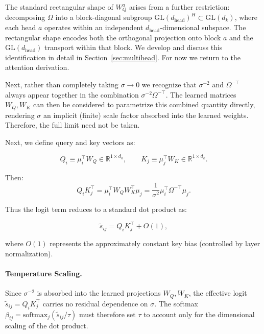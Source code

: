 \documentclass[twoside,11pt]{article}
\begin{document}
The standard rectangular shape of $W_Q^a$ arises from a further restriction: decomposing $\Omega$ into a block-diagonal subgroup $\mathrm{GL}(d_{\text{head}})^H \subset \mathrm{GL}(d_k)$, where each head $a$ operates within an independent $d_{\text{head}}$-dimensional subspace. The rectangular shape encodes both the orthogonal projection onto block $a$ and the $\mathrm{GL}(d_{\text{head}})$ transport within that block. We develop and discuss this identification in detail in Section~\ref{sec:multihead}. For now we return to the attention derivation.

Next, rather than completely taking $\sigma \to 0$ we recognize that $\sigma^{-2}$ and $\Omega^{-\top}$ always appear together in the combination $\sigma^{-2}\Omega^{-\top}$. The learned matrices $W_Q, W_K$ can then be considered to parametrize this combined quantity directly, rendering $\sigma$ an implicit (finite) scale factor absorbed into the learned weights. Therefore, the full limit need not be taken.

Next, we define query and key vectors as:

\begin{equation}
Q_i \equiv \mu_i^\top W_Q \in \mathbb{R}^{1\times d_k}, \qquad K_j \equiv \mu_j^\top W_K \in \mathbb{R}^{1\times d_k}.
\end{equation}

Then:
\begin{equation}
Q_i K_j^\top = \mu_i^\top W_Q W_K^\top \mu_j = \frac{1}{\sigma^2}\mu_i^\top \Omega^{-\top} \mu_j.
\end{equation}

Thus the logit term reduces to a standard dot product as:

\begin{equation}
\tilde{s}_{ij} = Q_i K_j^\top + O(1),
\end{equation}

where $O(1)$ represents the approximately constant key bias (controlled by layer normalization).

\paragraph{Temperature Scaling.}

Since $\sigma^{-2}$ is absorbed into the learned projections $W_Q, W_K$, the effective logit $\tilde{s}_{ij} = Q_i K_j^\top$ carries no residual dependence on $\sigma$. The softmax $\beta_{ij} = \mathrm{softmax}_j(\tilde{s}_{ij}/\tau)$ must therefore set $\tau$ to account only for the dimensional scaling of the dot product.
\end{document}
